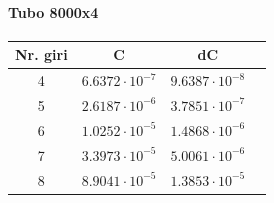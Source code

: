 \paragraph{Tubo 8000x4 \\}

\begin{center}
    \begin{tabular}{c c c c}
        \toprule
        Nr. giri & C & dC & \\
        \midrule
        4 & $6.6372 \cdot 10^{-7}$ & $9.6387 \cdot 10^{-8}$ & \\
        5 & $2.6187 \cdot 10^{-6}$ & $3.7851 \cdot 10^{-7}$ & \\
        6 & $1.0252 \cdot 10^{-5}$ & $1.4868 \cdot 10^{-6}$ & \\
        7 & $3.3973 \cdot 10^{-5}$ & $5.0061 \cdot 10^{-6}$ & \\
        8 & $8.9041 \cdot 10^{-5}$ & $1.3853 \cdot 10^{-5}$ & \\
        \bottomrule
    \end{tabular}
\end{center}
